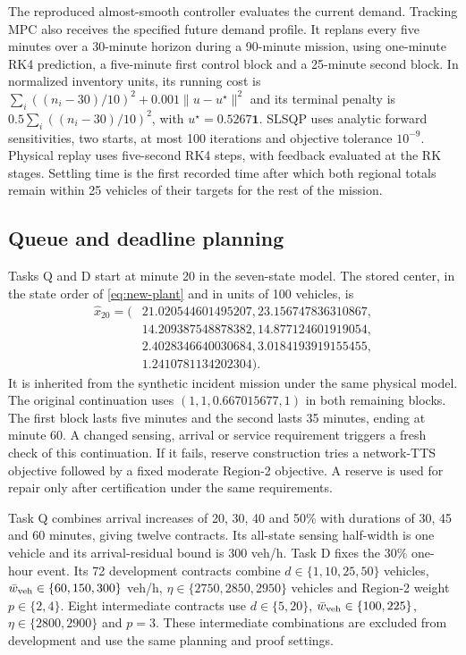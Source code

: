 \documentclass[preprint,12pt]{elsarticle}
\begin{document}
The reproduced almost-smooth controller evaluates the current demand.
Tracking MPC also receives the specified future demand profile. It replans
every five minutes over a 30-minute horizon during a 90-minute mission,
using one-minute RK4 prediction, a five-minute first control block and a
25-minute second block. In normalized inventory units, its running cost is
$\sum_i((n_i-30)/10)^2+0.001\|u-u^\star\|^2$ and its terminal penalty is
$0.5\sum_i((n_i-30)/10)^2$, with $u^\star=0.5267\mathbf1$.
SLSQP uses analytic forward sensitivities, two starts, at most 100
iterations and objective tolerance $10^{-9}$. Physical replay uses
five-second RK4 steps, with feedback evaluated at the RK stages. Settling
time is the first recorded time after which both regional totals remain
within 25 vehicles of their targets for the rest of the mission.

\subsection{Queue and deadline planning}
\label{sec:supp-queue-settings}
Tasks Q and D start at minute 20 in the seven-state model. The stored center,
in the state order of \eqref{eq:new-plant} and in units of 100 vehicles, is
\[
\begin{aligned}
\widehat x_{20}=(&21.020544601495207,23.156747836310867,\\
&14.209387548878382,14.877124601919054,\\
&2.4028346640030684,3.0184193919155455,\\
&1.2410781134202304).
\end{aligned}
\]
It is inherited from the synthetic incident mission under the same
physical model. The original continuation uses
$(1,1,0.667015677,1)$ in both remaining blocks. The first block lasts five
minutes and the second lasts 35 minutes, ending at minute 60. A changed
sensing, arrival or service requirement triggers a fresh check of this
continuation. If it fails, reserve construction tries a network-TTS
objective followed by a fixed moderate Region-2 objective. A reserve is
used for repair only after certification under the same requirements.

Task Q combines arrival increases of 20, 30, 40 and 50\% with durations of
30, 45 and 60 minutes, giving twelve contracts. Its all-state sensing
half-width is one vehicle and its arrival-residual bound is 300 veh/h.
Task D fixes the 30\% one-hour event. Its 72 development contracts combine
$d\in\{1,10,25,50\}$ vehicles,
$\bar w_{\rm veh}\in\{60,150,300\}$ veh/h,
$\eta\in\{2750,2850,2950\}$ vehicles and Region-2 weight $p\in\{2,4\}$.
Eight intermediate contracts use $d\in\{5,20\}$,
$\bar w_{\rm veh}\in\{100,225\}$, $\eta\in\{2800,2900\}$ and $p=3$.
These intermediate combinations are excluded from development and use
the same planning and proof settings.
\end{document}
